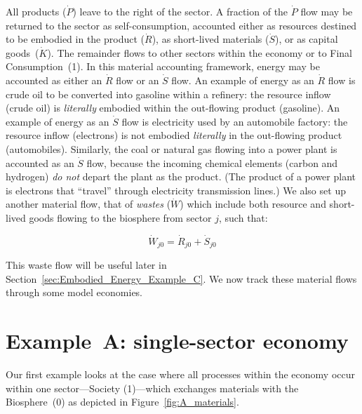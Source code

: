 All products ($\dot{P}$) leave to the right of the sector. 
A fraction of the $\dot{P}$ flow may be returned 
to the sector as self-consumption, 
accounted either as resources destined 
to be embodied in the product ($\dot{R}$), 
as short-lived materials ($\dot{S}$), 
or as capital goods~($\dot{K}$).
The remainder flows to other sectors within the economy 
or to Final Consumption~(1). 
In this material accounting framework, 
energy may be accounted as either 
an $\dot{R}$ flow or an $\dot{S}$ flow.
An example of energy as an $\dot{R}$ flow is crude oil 
to be converted into gasoline within a refinery: 
the resource inflow (crude oil) is
\emph{literally} embodied within the out-flowing product (gasoline).
An example of energy as an $\dot{S}$ flow is electricity
used by an automobile factory: the resource inflow (electrons)
is not embodied \emph{literally} in the out-flowing product (automobiles).
Similarly, the coal or natural gas flowing into a
power plant is accounted as an $\dot{S}$ flow, 
because the incoming chemical elements (carbon and hydrogen) \emph{do
not} depart the plant as the product.  
(The product of a power plant is electrons that ``travel'' through
electricity transmission lines.)
We also set up another material flow,
that of \emph{wastes} ($\dot{W}$) which include both
resource and short-lived goods flowing to the biosphere from sector $j$, 
such that:

\begin{equation}
\dot{W}_{j0} =  \dot{R}_{j0} + \dot{S}_{j0}
\end{equation}

This waste flow will be useful later in Section~\ref{sec:Embodied_Energy_Example_C}.
We now track these material flows through some model economies.

\section{Example~A: single-sector economy} %
\label{sec:A_materials}

Our first example looks at the case where 
all processes within the economy occur within
one sector---Society (1)---which exchanges materials 
with the Biosphere~(0) as depicted in
Figure~\ref{fig:A_materials}.  


